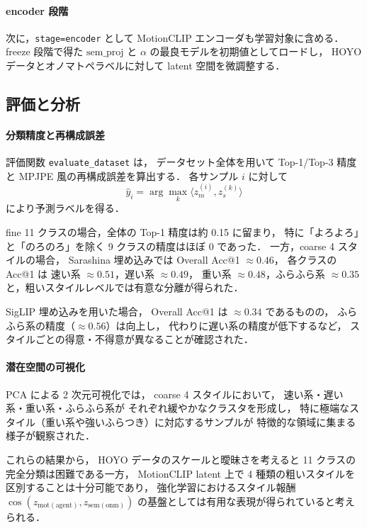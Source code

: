 \documentclass[a4paper,10pt]{jsarticle}
\begin{document}
\paragraph{encoder 段階}
次に，\texttt{stage=encoder} として
MotionCLIP エンコーダも学習対象に含める．
freeze 段階で得た
$\mathrm{sem\_proj}$ と $\alpha$ の最良モデルを初期値としてロードし，
HOYO データとオノマトペラベルに対して latent 空間を微調整する．

\subsection{評価と分析}

\paragraph{分類精度と再構成誤差}
評価関数 \texttt{evaluate\_dataset} は，
データセット全体を用いて
Top-1/Top-3 精度と MPJPE 風の再構成誤差を算出する．
各サンプル $i$ に対して
\[
\hat{y}_i = \arg\max_k \langle z_m^{(i)}, z_s^{(k)} \rangle
\]
により予測ラベルを得る．

fine 11 クラスの場合，全体の Top-1 精度は約 0.15 に留まり，
特に「よろよろ」と「のろのろ」を除く 9 クラスの精度はほぼ 0 であった．
一方，coarse 4 スタイルの場合，
Sarashina 埋め込みでは
Overall Acc@1 $\approx 0.46$，
各クラスの Acc@1 は
速い系 $\approx 0.51$，遅い系 $\approx 0.49$，
重い系 $\approx 0.48$，ふらふら系 $\approx 0.35$
と，粗いスタイルレベルでは有意な分離が得られた．

SigLIP 埋め込みを用いた場合，
Overall Acc@1 は $\approx 0.34$ であるものの，
ふらふら系の精度（$\approx 0.56$）は向上し，
代わりに遅い系の精度が低下するなど，
スタイルごとの得意・不得意が異なることが確認された．

\paragraph{潜在空間の可視化}
PCA による 2 次元可視化では，
coarse 4 スタイルにおいて，
速い系・遅い系・重い系・ふらふら系が
それぞれ緩やかなクラスタを形成し，
特に極端なスタイル（重い系や強いふらつき）に対応するサンプルが
特徴的な領域に集まる様子が観察された．

これらの結果から，
HOYO データのスケールと曖昧さを考えると
11 クラスの完全分類は困難である一方，
MotionCLIP latent 上で 4 種類の粗いスタイルを
区別することは十分可能であり，
強化学習におけるスタイル報酬
$\cos(z_{\mathrm{mot(agent)}}, z_{\mathrm{sem(onm)}})$
の基盤としては有用な表現が得られていると考えられる．
\end{document}

